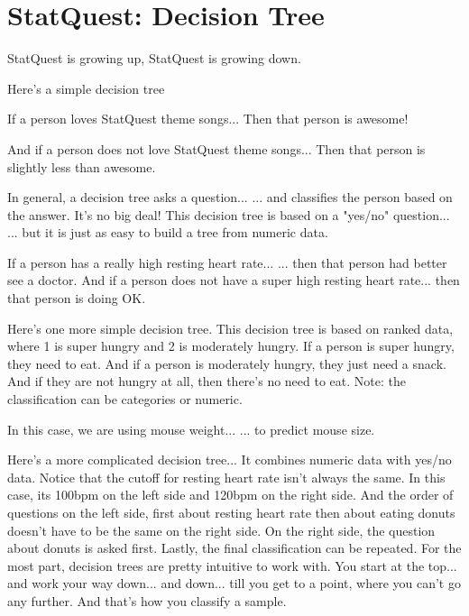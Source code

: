 \documentclass[
	final,
	a4paper,
	oneside,
	parskip=full,
	headings=standardclasses,
	headings=big,
	pointednumbers
]{scrartcl}
\begin{document}
    \section*{StatQuest: Decision Tree}
    
        StatQuest is growing up, StatQuest is growing down.
        
        Here's a simple decision tree
        
        If a person loves StatQuest theme songs...
        Then that person is awesome!
        
        And if a person does not love StatQuest theme songs...
        Then that person is slightly less than awesome.
        
        In general, a decision tree asks a question...
        ... and classifies the person based on the answer.
        It's no big deal!
        This decision tree is based on a "yes/no" question...
        ... but it is just as easy to build a tree from numeric data.
        
        If a person has a really high resting heart rate...
        ... then that person had better see a doctor.
        And if a person does not have a super high resting heart rate...
        then that person is doing OK.
        
        Here's one more simple decision tree.
        This decision tree is based on ranked data, where
        1 is super hungry and
        2 is moderately hungry.
        If a person is super hungry, they need to eat.
        And if a person is moderately hungry, they just need a snack.
        And if they are not hungry at all, then there's no need to eat.
        Note: the classification can be categories or numeric.
        
        In this case, we are using mouse weight...
        ... to predict mouse size.
        
        Here's a more complicated decision tree...
        It combines numeric data with yes/no data.
        Notice that the cutoff for resting heart rate isn't always the same.
        In this case, its 100bpm on the left side and 120bpm on the right side.
        And the order of questions on the left side,
        first about resting heart rate then about eating donuts doesn't
        have to be the same on the right side. On the right side, the question about
        donuts is asked first.
        Lastly, the final classification can be repeated.
        For the most part, decision trees are pretty intuitive to work with.
        You start at the top... and work your way down... and down...
        till you get to a point, where you can't go any further.
        And that's how you classify a sample.
        
\end{document}
